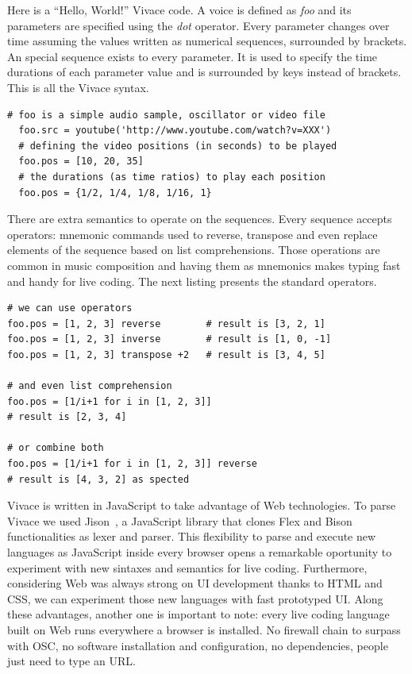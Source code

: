 \documentclass[letterpaper, 12pt]{article}
\begin{document}
Here is a ``Hello, World!'' Vivace code. A voice is defined as
\textit{foo} and its parameters are specified using the \textit{dot}
operator. Every parameter changes over time assuming the values
written as numerical sequences, surrounded by brackets. An special
sequence exists to every parameter. It is used to specify the time
durations of each parameter value and is surrounded by keys instead of
brackets. This is all the Vivace syntax.

\begin{Verbatim}[fontfamily=courier, xleftmargin=\parindent]
  # foo is a simple audio sample, oscillator or video file
  foo.src = youtube('http://www.youtube.com/watch?v=XXX')
  # defining the video positions (in seconds) to be played
  foo.pos = [10, 20, 35]
  # the durations (as time ratios) to play each position
  foo.pos = {1/2, 1/4, 1/8, 1/16, 1}
\end{Verbatim}

There are extra semantics to operate on the sequences. Every sequence
accepts operators: mnemonic commands used to reverse, transpose and
even replace elements of the sequence based on list
comprehensions. Those operations are common in music composition and
having them as mnemonics makes typing fast and handy for live
coding. The next listing presents the standard operators.

\begin{Verbatim}[fontfamily=courier, xleftmargin=\parindent]
# we can use operators
foo.pos = [1, 2, 3] reverse        # result is [3, 2, 1]
foo.pos = [1, 2, 3] inverse        # result is [1, 0, -1]
foo.pos = [1, 2, 3] transpose +2   # result is [3, 4, 5]

# and even list comprehension
foo.pos = [1/i+1 for i in [1, 2, 3]] 
# result is [2, 3, 4]

# or combine both
foo.pos = [1/i+1 for i in [1, 2, 3]] reverse 
# result is [4, 3, 2] as spected
\end{Verbatim}

Vivace is written in JavaScript to take advantage of Web technologies.
To parse Vivace we used Jison~\cite{jison}, a JavaScript library that
clones Flex and Bison functionalities as lexer and parser. This
flexibility to parse and execute new languages as JavaScript inside
every browser opens a remarkable oportunity to experiment with new
sintaxes and semantics for live coding. Furthermore, considering Web
was always strong on UI development thanks to HTML and CSS, we can
experiment those new languages with fast prototyped UI. Along these
advantages, another one is important to note: every live coding
language built on Web runs everywhere a browser is installed. No
firewall chain to surpass with OSC, no software installation and
configuration, no dependencies, people just need to type an URL.
\end{document}
